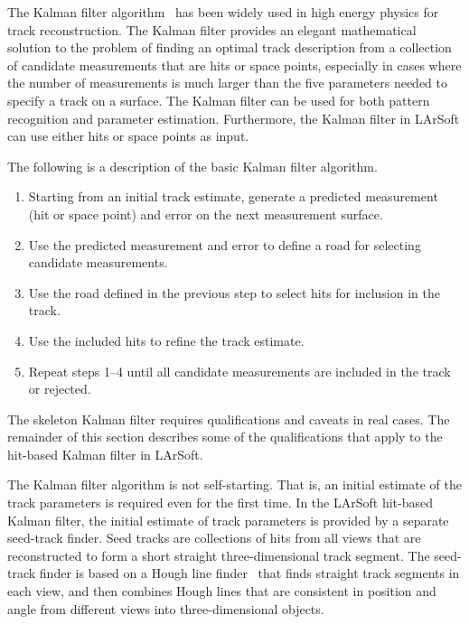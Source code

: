 \documentclass[12pt]{elsarticle}
\begin{document}
The Kalman filter algorithm~\cite{kalman} has been widely used in high
energy physics for track reconstruction. The Kalman
filter provides an elegant mathematical solution to the problem of
finding an optimal track description from a collection of candidate
measurements that are hits or space points, especially in cases where the
number of measurements is much larger than the five parameters
needed to specify a track on a surface.  The Kalman
filter can be used for both pattern recognition and parameter
estimation.  Furthermore, the Kalman filter in LArSoft can use either hits or
space points as input.

The following is a description of the basic Kalman filter algorithm.

\begin{enumerate}
\item
Starting from an initial track estimate, generate a predicted
measurement (hit or space point) and error on the next measurement
surface.
\item
Use the predicted measurement and error to define a road for selecting
candidate measurements.
\item
Use the road defined in the previous step to select hits for inclusion
in the track.
\item
Use the included hits to refine the track estimate.
\item
Repeat steps 1--4 until all candidate measurements are included in the
track or rejected.
\end{enumerate}

The skeleton Kalman filter requires qualifications and caveats in real cases. The remainder of this
section describes some of the qualifications that apply to the
hit-based Kalman filter in LArSoft.

The Kalman
filter algorithm is not self-starting. That is, an initial estimate
of the track parameters is required even for the first time.  In the LArSoft hit-based Kalman filter, the initial
estimate of track parameters is provided
by a separate seed-track finder. Seed tracks are
collections of hits from all views that are reconstructed to form a
short straight three-dimensional track segment. The seed-track finder
is based on a Hough line finder~\cite{ppht} that finds straight track
segments in each view, and then combines 
Hough lines that are consistent in position and angle from different views into three-dimensional
objects.
\end{document}
